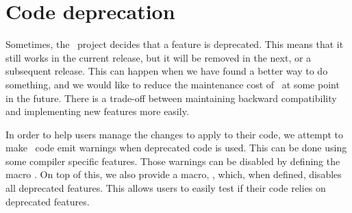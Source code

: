 \section{Code deprecation}

Sometimes, the \cgal\ project decides that a feature is deprecated.  This means
that it still works in the current release, but it will be removed in the next,
or a subsequent release.  This can happen when we have found a better way to do
something, and we would like to reduce the maintenance cost of \cgal\ at some
point in the future.  There is a trade-off between maintaining backward
compatibility and implementing new features more easily.

In order to help users manage the changes to apply to their code, we attempt
to make \cgal\ code emit warnings when deprecated code is used.  This can be
done using some compiler specific features.  Those warnings can be disabled
by defining the macro .  On top of this, we
also provide a macro, , which, when defined,
disables all deprecated features.  This allows users to easily test if their
code relies on deprecated features.


